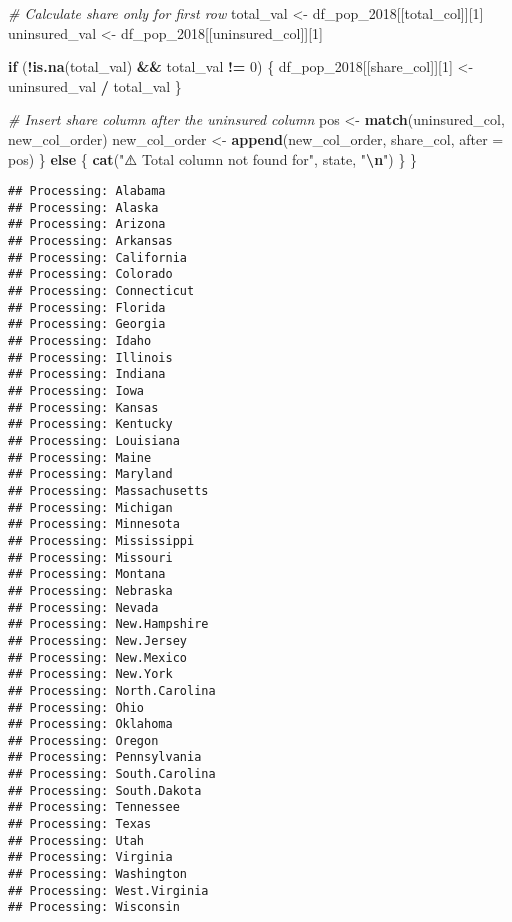 \documentclass[
]{article}
\newenvironment{Shaded}{\begin{snugshade}}{\end{snugshade}}
\newcommand{\AttributeTok}[1]{\textcolor[rgb]{0.13,0.29,0.53}{#1}}
\newcommand{\CommentTok}[1]{\textcolor[rgb]{0.56,0.35,0.01}{\textit{#1}}}
\newcommand{\ControlFlowTok}[1]{\textcolor[rgb]{0.13,0.29,0.53}{\textbf{#1}}}
\newcommand{\DecValTok}[1]{\textcolor[rgb]{0.00,0.00,0.81}{#1}}
\newcommand{\FunctionTok}[1]{\textcolor[rgb]{0.13,0.29,0.53}{\textbf{#1}}}
\newcommand{\NormalTok}[1]{#1}
\newcommand{\OtherTok}[1]{\textcolor[rgb]{0.56,0.35,0.01}{#1}}
\newcommand{\SpecialCharTok}[1]{\textcolor[rgb]{0.81,0.36,0.00}{\textbf{#1}}}
\newcommand{\StringTok}[1]{\textcolor[rgb]{0.31,0.60,0.02}{#1}}
\begin{document}
\begin{Shaded}
\begin{Highlighting}[]
    \CommentTok{\# Calculate share only for first row}
\NormalTok{    total\_val }\OtherTok{\textless{}{-}}\NormalTok{ df\_pop\_2018[[total\_col]][}\DecValTok{1}\NormalTok{]}
\NormalTok{    uninsured\_val }\OtherTok{\textless{}{-}}\NormalTok{ df\_pop\_2018[[uninsured\_col]][}\DecValTok{1}\NormalTok{]}
    
    \ControlFlowTok{if}\NormalTok{ (}\SpecialCharTok{!}\FunctionTok{is.na}\NormalTok{(total\_val) }\SpecialCharTok{\&\&}\NormalTok{ total\_val }\SpecialCharTok{!=} \DecValTok{0}\NormalTok{) \{}
\NormalTok{      df\_pop\_2018[[share\_col]][}\DecValTok{1}\NormalTok{] }\OtherTok{\textless{}{-}}\NormalTok{ uninsured\_val }\SpecialCharTok{/}\NormalTok{ total\_val}
\NormalTok{    \}}
    
    \CommentTok{\# Insert share column after the uninsured column}
\NormalTok{    pos }\OtherTok{\textless{}{-}} \FunctionTok{match}\NormalTok{(uninsured\_col, new\_col\_order)}
\NormalTok{    new\_col\_order }\OtherTok{\textless{}{-}} \FunctionTok{append}\NormalTok{(new\_col\_order, share\_col, }\AttributeTok{after =}\NormalTok{ pos)}
\NormalTok{  \} }\ControlFlowTok{else}\NormalTok{ \{}
    \FunctionTok{cat}\NormalTok{(}\StringTok{"⚠️ Total column not found for"}\NormalTok{, state, }\StringTok{"}\SpecialCharTok{\textbackslash{}n}\StringTok{"}\NormalTok{)}
\NormalTok{  \}}
\NormalTok{\}}
\end{Highlighting}
\end{Shaded}

\begin{verbatim}
## Processing: Alabama 
## Processing: Alaska 
## Processing: Arizona 
## Processing: Arkansas 
## Processing: California 
## Processing: Colorado 
## Processing: Connecticut 
## Processing: Florida 
## Processing: Georgia 
## Processing: Idaho 
## Processing: Illinois 
## Processing: Indiana 
## Processing: Iowa 
## Processing: Kansas 
## Processing: Kentucky 
## Processing: Louisiana 
## Processing: Maine 
## Processing: Maryland 
## Processing: Massachusetts 
## Processing: Michigan 
## Processing: Minnesota 
## Processing: Mississippi 
## Processing: Missouri 
## Processing: Montana 
## Processing: Nebraska 
## Processing: Nevada 
## Processing: New.Hampshire 
## Processing: New.Jersey 
## Processing: New.Mexico 
## Processing: New.York 
## Processing: North.Carolina 
## Processing: Ohio 
## Processing: Oklahoma 
## Processing: Oregon 
## Processing: Pennsylvania 
## Processing: South.Carolina 
## Processing: South.Dakota 
## Processing: Tennessee 
## Processing: Texas 
## Processing: Utah 
## Processing: Virginia 
## Processing: Washington 
## Processing: West.Virginia 
## Processing: Wisconsin
\end{verbatim}
\end{document}

